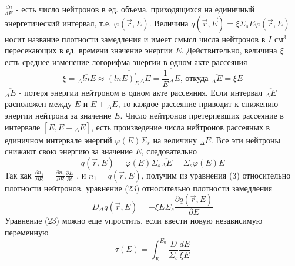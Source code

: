 \documentclass[a4paper]{article}
\begin{document}
    $\frac{dn}{dE}$ - есть число нейтронов в ед. объема,
    приходящихся на единичный энергетический интервал, т.е.
    $\varphi(\overrightarrow{r},E)$.
    \newline
    Величина \(q(\overrightarrow{r},\overrightarrow{E})=
    \xi\Sigma_s E\varphi(\overrightarrow{r},E) \)
    носит название плотности замедления и имеет смысл числа нейтронов
    в $I\text{ см}^3$ пересекающих в ед. времени значение энергии $E$.
    \newline
    Действительно, величина $\xi$ есть среднее изменение логорифма
    энергии в одном акте рассеяния
    \begin{equation}
        \xi = \overline{_\Delta ln E} \approx
        \overline{(ln E)^{'}_E {}_\Delta E} =
        \overline{\frac{1}{E} {}_\Delta E}
        \text{, откуда } \overline{{}_\Delta E} = \xi E
    \end{equation}
    \newline
    $\overline{{}_\Delta E}$ - потеря энергии нейтроном в одном акте
    рассеяния. Если интервал $\overline{{}_\Delta E}$ расположен
    между $E$ и $E + \overline{{}_\Delta E}$, то каждое рассеяние
    приводит к снижению энергии нейтрона за значение $E$.
    \newline
    Число нейтронов претерпевших рассеяние в интервале
    $[E, E + \overline{{}_\Delta E}]$, есть произведение числа
    нейтронов рассеяных в единичном интервале энергий
    $\varphi(E)\Sigma_s$ на величину
    $\overline{{}_\Delta E}$. Все эти нейтроны снижают свою энергию
    за значение $E$, следовательно
    \begin{equation}
        q(\overrightarrow{r},E) =
        \varphi(E)\Sigma_s\overline{{}_\Delta E} =
        \Sigma_s\varphi(E)E
    \end{equation}
    \newline
    Так как \(\frac{\partial n_1}{\partial E} =
    \frac{\partial n_1}{\partial E} \frac{\partial E}{\partial t}\)
    , и \(n_1 = q(\overrightarrow{r},E)\), получим из уравнения (3)
    относительно плотности нейтронов, уравнение (23) относительно
    плотности замедления
    \begin{equation}
        D_\Delta q(\overrightarrow{r}, E) = -\xi E\Sigma_s
        \frac{\partial q(\overrightarrow{r}, E)}{\partial E}
    \end{equation}
    Уравнение (23) можно еще упростить, если ввести новую независимую
    переменную
    \begin{equation}\nonumber
        \tau(E) = \int_E^{E_0} \frac{D}{\Sigma_s}\frac{dE}{\xi E}
    \end{equation}
\end{document}

